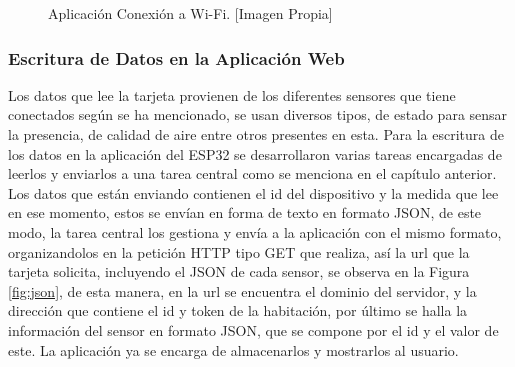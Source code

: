 \begin{figure}[!t]
	\centering
	\caption[Aplicación Conexión a Wi-Fi.]{Aplicación Conexión a Wi-Fi. [Imagen Propia]}
	\label{fig:wifi}
\end{figure}

\subsubsection*{Escritura de Datos en la Aplicación Web}

Los datos que lee la tarjeta provienen de los diferentes sensores que tiene conectados según se ha mencionado, se usan diversos tipos, de estado para sensar la presencia, de calidad de aire entre otros presentes en esta. Para la escritura de los datos en la aplicación del ESP32 se desarrollaron varias tareas encargadas de leerlos y enviarlos a una tarea central como se menciona en el capítulo anterior. Los datos que están enviando contienen el id del dispositivo y la medida que lee en ese momento, estos se envían en forma de texto en formato JSON, de este modo, la tarea central los gestiona y envía a la aplicación con el mismo formato, organizandolos en la petición HTTP tipo GET que realiza, así la url que la tarjeta solicita, incluyendo el JSON de cada sensor, se observa en la Figura \ref{fig:json}, de esta manera, en la url se encuentra el dominio del servidor, y la dirección que contiene el id y token de la habitación, por último se halla la información del sensor en formato JSON, que se compone por el id y el valor de este. La aplicación ya se encarga de almacenarlos y mostrarlos al usuario.\\

